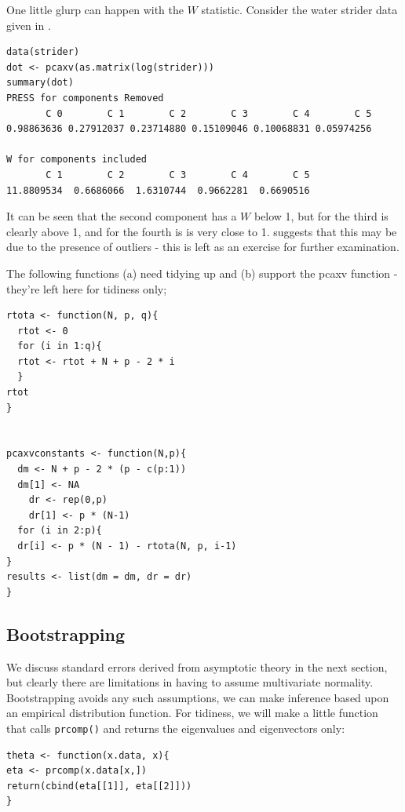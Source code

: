 One little glurp can happen with the $W$ statistic.   Consider the water strider data given in \cite{Flury:1997}.

\singlespacing
\begin{verbatim}
data(strider)
dot <- pcaxv(as.matrix(log(strider)))
summary(dot)
PRESS for components Removed 
       C 0        C 1        C 2        C 3        C 4        C 5 
0.98863636 0.27912037 0.23714880 0.15109046 0.10068831 0.05974256 

W for components included 
       C 1        C 2        C 3        C 4        C 5 
11.8809534  0.6686066  1.6310744  0.9662281  0.6690516 
\end{verbatim}
\onehalfspacing

It can be seen that the second component has a $W$ below 1, but for the third is clearly above 1, and for the fourth is is very close to 1.   \cite{Jackson:1991} suggests that this may be due to the presence of outliers - this is left as an exercise for further examination.


The following functions (a) need tidying up and (b) support the pcaxv function - they're left here for tidiness only;

\singlespacing
\begin{verbatim}
rtota <- function(N, p, q){
  rtot <- 0
  for (i in 1:q){
  rtot <- rtot + N + p - 2 * i
  }
rtot
}


pcaxvconstants <- function(N,p){
  dm <- N + p - 2 * (p - c(p:1))
  dm[1] <- NA
    dr <- rep(0,p)
    dr[1] <- p * (N-1)
  for (i in 2:p){
  dr[i] <- p * (N - 1) - rtota(N, p, i-1)
}
results <- list(dm = dm, dr = dr)
}
\end{verbatim}
\onehalfspacing



\subsection{Bootstrapping}
\label{bootstrap}

We discuss standard errors derived from asymptotic theory in the next section, but clearly there are limitations in having to assume multivariate normality.   Bootstrapping avoids any such assumptions, we can make inference based upon an empirical distribution function.   For tidiness, we will make a little function that calls \texttt{prcomp()} and returns the eigenvalues and eigenvectors only:

\singlespacing
\begin{verbatim}
theta <- function(x.data, x){
eta <- prcomp(x.data[x,])
return(cbind(eta[[1]], eta[[2]]))
}
\end{verbatim}
\onehalfspacing


